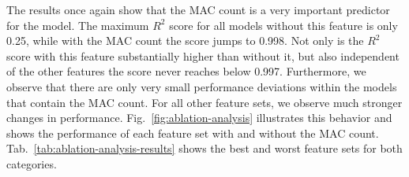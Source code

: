 The results once again show that the MAC count is a very important predictor for the model. The maximum $R^2$ score for all models without this feature is only 0.25, while with the MAC count the score jumps to 0.998. Not only is the $R^2$ score with this feature substantially higher than without it, but also independent of the other features the score never reaches below 0.997. Furthermore, we observe that there are only very small performance deviations within the models that contain the MAC count. For all other feature sets, we observe much stronger changes in performance. Fig.~\ref{fig:ablation-analysis} illustrates this behavior and shows the performance of each feature set with and without the MAC count. Tab.~\ref{tab:ablation-analysis-results} shows the best and worst feature sets for both categories.
\begin{table}[ht]
    \caption{Shows the best and worst feature combinations with their $R^2$ scores for both categories.}
    \label{tab:ablation-analysis-results}
    \centering
\end{table}
%

